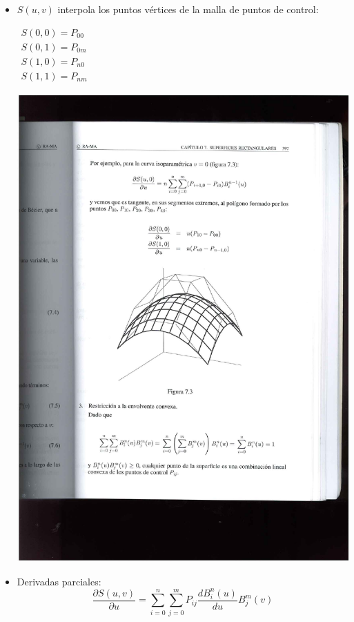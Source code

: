 \documentclass[ebook,oneside]{memoir}
\begin{document}
\begin{itemize}
\item $S(u,v)$ interpola los puntos v\'{e}rtices de la malla de puntos de control:

\begin{center}


\end{center}
\begin{minipage}{.3 \textwidth}
$\begin{array}{c} S(0,0)=P_{00}\\ S(0,1)=P_{0m}\\
S(1,0)=P_{n0}\\ S(1,1)=P_{nm}
\end{array}$
\end{minipage} \quad
\begin{minipage}{.3 \textwidth}
\includegraphics[scale=0.45]{7_2.pdf}
\end{minipage}

\item Derivadas parciales:
$$\frac{\partial S(u,v)}{\partial u}=\sum_{i=0}^n \sum_{j=0}^m P_{ij} \frac{dB_i^n(u)}{d u} B_j^m(v)$$
\end{itemize}
\end{document}

